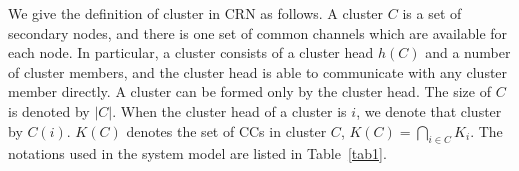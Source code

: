 \documentclass[times]{ettauth}
\theoremstyle{mytheoremstyle}
\theoremstyle{mytheoremstyle}
\theoremstyle{mytheoremstyle}
\begin{document}
We give the definition of cluster in CRN as follows. 
A cluster $C$ is a set of secondary nodes, and there is one set of common channels which are available for each node.
In particular, a cluster consists of a cluster head $h(C)$ and a number of cluster members, and the cluster head is able to communicate with any cluster member directly.
A cluster can be formed only by the cluster head.
The size of $C$ is denoted by $|C|$.
When the cluster head of a cluster is $i$, we denote that cluster by $C(i)$.
$K(C)$ denotes the set of CCs in cluster $C$, $ K(C) = \bigcap_{i\in C} K_i$.
The notations used in the system model are listed in Table~\ref{tab1}.
\end{document}
